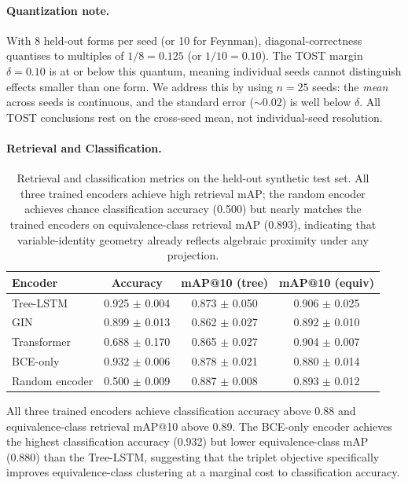 \paragraph{Quantization note.} With 8 held-out forms per seed (or 10 for Feynman), diagonal-correctness quantises to multiples of $1/8 = 0.125$ (or $1/10 = 0.10$). The TOST margin $\delta{=}0.10$ is at or below this quantum, meaning individual seeds cannot distinguish effects smaller than one form. We address this by using $n{=}25$ seeds: the \emph{mean} across seeds is continuous, and the standard error (${\sim}0.02$) is well below $\delta$. All TOST conclusions rest on the cross-seed mean, not individual-seed resolution.

\paragraph{Retrieval and Classification.}
\begin{table}[h]
\centering
\caption{Retrieval and classification metrics on the held-out synthetic test set. All three trained encoders achieve high retrieval mAP; the random encoder achieves chance classification accuracy (0.500) but nearly matches the trained encoders on equivalence-class retrieval mAP (0.893), indicating that variable-identity geometry already reflects algebraic proximity under any projection.}
\label{tab:retrieval}
\begin{tabular}{lccc}
\toprule
Encoder & Accuracy & mAP@10 (tree) & mAP@10 (equiv) \\
\midrule
Tree-LSTM & 0.925 $\pm$ 0.004 & 0.873 $\pm$ 0.050 & 0.906 $\pm$ 0.025 \\
GIN & 0.899 $\pm$ 0.013 & 0.862 $\pm$ 0.027 & 0.892 $\pm$ 0.010 \\
Transformer & 0.688 $\pm$ 0.170 & 0.865 $\pm$ 0.027 & 0.904 $\pm$ 0.007 \\
BCE-only & 0.932 $\pm$ 0.006 & 0.878 $\pm$ 0.021 & 0.880 $\pm$ 0.014 \\
Random encoder & 0.500 $\pm$ 0.009 & 0.887 $\pm$ 0.008 & 0.893 $\pm$ 0.012 \\
\bottomrule
\end{tabular}
\end{table}

All three trained encoders achieve classification accuracy above 0.88 and equivalence-class retrieval mAP@10 above 0.89. The BCE-only encoder achieves the highest classification accuracy (0.932) but lower equivalence-class mAP (0.880) than the Tree-LSTM, suggesting that the triplet objective specifically improves equivalence-class clustering at a marginal cost to classification accuracy.

